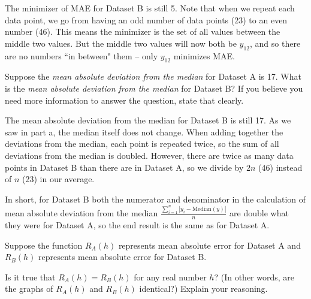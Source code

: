 \documentclass{article}
\begin{document}
\begin{probset}
\begin{prob}
\begin{subprobset}
\begin{subprob}[3 Points]
\begin{soln}

The minimizer of MAE for Dataset B is still 5. Note that when we repeat each data point, we go from having an odd number of data points (23) to an even number (46). This means the minimizer is the set of all values between the middle two values. But the middle two values will now both be $y_{12}$, and so there are no numbers ``in between" them -- only $y_{12}$ minimizes MAE.

\end{soln}

\end{subprob}

\vspace{1.5in}

\begin{subprob}[3 Points]
Suppose the \textit{mean absolute deviation from the median} for Dataset A is 17. What is the \textit{mean absolute deviation from the median} for Dataset B? If you believe you need more information to answer the question, state that clearly.

\begin{soln}

The mean absolute deviation from the median for Dataset B is still 17. As we saw in part a, the median itself does not change. When adding together the deviations from the median, each point is repeated twice, so the sum of all deviations from the median is doubled. However, there are twice as many data points in Dataset B than there are in Dataset A, so we divide by $2n$ (46) instead of $n$ (23) in our average. 

In short, for Dataset B both the numerator and denominator in the calculation of mean absolute deviation from the median $\frac{\sum_{i = 1}^n |y_i - \text{Median}(y)|}{n}$ are double what they were for Dataset A, so the end result is the same as for Dataset A.

\end{soln}

\end{subprob}

\vspace{1.55in}

\begin{subprob}[3 Points]
Suppose the function $R_A(h)$ represents mean absolute error for Dataset A and $R_B(h)$ represents mean absolute error for Dataset B.

Is it true that $R_A(h) = R_B(h)$ for any real number $h$? (In other words, are the graphs of $R_A(h)$ and $R_B(h)$ identical?) Explain your reasoning.


\end{subprob}
\end{subprobset}
\end{prob}
\end{probset}
\end{document}

